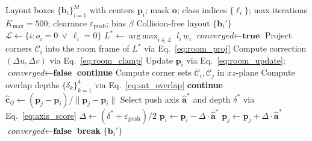 \begin{algorithm}[!t]
\caption{Post-Processing SAT Collision Resolver}
\label{alg:collision_resolver}                        
\begin{algorithmic}[1]
\REQUIRE Layout boxes $\{\mathbf{b}_i\}_{i=1}^{M}$ with centers $\mathbf{p}_i$; mask $\mathbf{o}$; class indices $\{\ell_i\}$; max iterations $K_{\max}=500$; clearance $\varepsilon_{\mathrm{push}}$; bias $\beta$
\ENSURE Collision-free layout $\{\mathbf{b}_i'\}$
\STATE $\mathcal{L} \gets \{i : o_i = 0 \ \lor\ \ell_i = 0\}$ 
\STATE $L^\ast \gets \operatorname*{arg\,max}_{i \in \mathcal{L}} \; l_i \, w_i$ 
    \STATE $\textit{converged} \gets \textbf{true}$
    \STATE {}
            \STATE Project corners $\mathcal{C}_i$ into the room frame of $L^\ast$ via Eq.~\eqref{eq:room_proj}
            \STATE Compute correction $(\Delta u, \Delta v)$ via Eq.~\eqref{eq:room_clamp}
                \STATE Update $\mathbf{p}_i$ via Eq.~\eqref{eq:room_update}; \ $\textit{converged} \gets \textbf{false}$
            \ENDIF
        \ENDFOR
    \ENDIF
    \STATE {}
            \STATE \textbf{continue} 
        \ENDIF
        \STATE Compute corner sets $\mathcal{C}_i, \mathcal{C}_j$ in $xz$-plane
        \STATE Compute overlap depths $\{\delta_k\}_{k=1}^{4}$ via Eq.~\eqref{eq:sat_overlap}
            \STATE \textbf{continue} 
        \ENDIF
        \STATE $\hat{\mathbf{c}}_{ij} \gets (\mathbf{p}_j - \mathbf{p}_i) / \|\mathbf{p}_j - \mathbf{p}_i\|$
        \STATE Select push axis $\hat{\mathbf{a}}^*$ and depth $\delta^*$ via Eq.~\eqref{eq:axis_score}
        \STATE $\Delta \gets (\delta^* + \varepsilon_{\mathrm{push}}) / 2$
        \STATE $\mathbf{p}_i \gets \mathbf{p}_i - \Delta \cdot \hat{\mathbf{a}}^*$
        \STATE $\mathbf{p}_j \gets \mathbf{p}_j + \Delta \cdot \hat{\mathbf{a}}^*$     
        \STATE $\textit{converged} \gets \textbf{false}$
    \ENDFOR
        \STATE \textbf{break}
    \ENDIF
\ENDFOR
\RETURN $\{\mathbf{b}_i'\}$
\end{algorithmic}
\end{algorithm}
